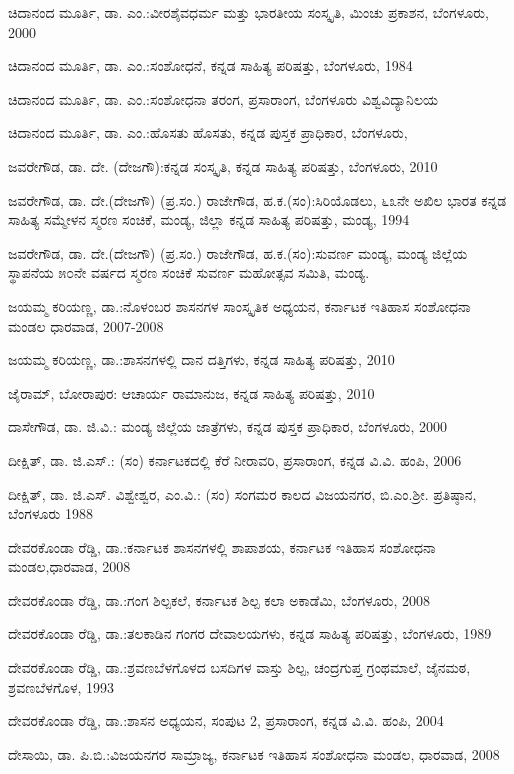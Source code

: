 \noindent
ಚಿದಾನಂದ ಮೂರ್ತಿ, ಡಾ. ಎಂ.:ವೀರಶೈವಧರ್ಮ ಮತ್ತು ಭಾರತೀಯ ಸಂಸ್ಕೃತಿ, ಮಿಂಚು ಪ್ರಕಾಶನ, ಬೆಂಗಳೂರು, 2000

\noindent
ಚಿದಾನಂದ ಮೂರ್ತಿ, ಡಾ. ಎಂ.:ಸಂಶೋಧನೆ, ಕನ್ನಡ ಸಾಹಿತ್ಯ ಪರಿಷತ್ತು, ಬೆಂಗಳೂರು, 1984

\noindent
ಚಿದಾನಂದ ಮೂರ್ತಿ, ಡಾ. ಎಂ.:ಸಂಶೋಧನಾ ತರಂಗ, ಪ್ರಸಾರಾಂಗ, ಬೆಂಗಳೂರು ವಿಶ್ವವಿದ್ಯಾನಿಲಯ

\noindent
ಚಿದಾನಂದ ಮೂರ್ತಿ, ಡಾ. ಎಂ.:ಹೊಸತು ಹೊಸತು, ಕನ್ನಡ ಪುಸ್ತಕ ಪ್ರಾಧಿಕಾರ, ಬೆಂಗಳೂರು,

\noindent
ಜವರೇಗೌಡ, ಡಾ. ದೇ. (ದೇಜಗೌ):ಕನ್ನಡ ಸಂಸ್ಕೃತಿ, ಕನ್ನಡ ಸಾಹಿತ್ಯ ಪರಿಷತ್ತು, ಬೆಂಗಳೂರು, 2010

\noindent
ಜವರೇಗೌಡ, ಡಾ. ದೇ.(ದೇಜಗೌ) (ಪ್ರ.ಸಂ.) ರಾಜೇಗೌಡ, ಹ.ಕ.(ಸಂ):ಸಿರಿಯೊಡಲು, ೬೩ನೇ ಅಖಿಲ ಭಾರತ ಕನ್ನಡ ಸಾಹಿತ್ಯ ಸಮ್ಮೇಳನ ಸ್ಮರಣ ಸಂಚಿಕೆ, ಮಂಡ್ಯ, ಜಿಲ್ಲಾ ಕನ್ನಡ ಸಾಹಿತ್ಯ ಪರಿಷತ್ತು, ಮಂಡ್ಯ, 1994

\noindent
ಜವರೇಗೌಡ, ಡಾ. ದೇ.(ದೇಜಗೌ) (ಪ್ರ.ಸಂ.) ರಾಜೇಗೌಡ, ಹ.ಕ.(ಸಂ):ಸುವರ್ಣ ಮಂಡ್ಯ, ಮಂಡ್ಯ ಜಿಲ್ಲೆಯ ಸ್ಥಾಪನೆಯ ೫೦ನೇ ವರ್ಷದ ಸ್ಮರಣ ಸಂಚಿಕೆ ಸುವರ್ಣ ಮಹೋತ್ಸವ ಸಮಿತಿ, ಮಂಡ್ಯ.

\noindent
ಜಯಮ್ಮ ಕರಿಯಣ್ಣ, ಡಾ.:ನೊಳಂಬರ ಶಾಸನಗಳ ಸಾಂಸ್ಕೃತಿಕ ಅಧ್ಯಯನ, ಕರ್ನಾಟಕ ಇತಿಹಾಸ ಸಂಶೋಧನಾ ಮಂಡಲ ಧಾರವಾಡ, 2007-2008

\noindent
ಜಯಮ್ಮ ಕರಿಯಣ್ಣ, ಡಾ.:ಶಾಸನಗಳಲ್ಲಿ ದಾನ ದತ್ತಿಗಳು, ಕನ್ನಡ ಸಾಹಿತ್ಯ ಪರಿಷತ್ತು, 2010

\noindent
ಜೈರಾಮ್, ಬೋರಾಪುರ: ಆಚಾರ್ಯ ರಾಮಾನುಜ, ಕನ್ನಡ ಸಾಹಿತ್ಯ ಪರಿಷತ್ತು, 2010

\noindent
ದಾಸೇಗೌಡ, ಡಾ. ಜಿ.ವಿ.: ಮಂಡ್ಯ ಜಿಲ್ಲೆಯ ಜಾತ್ರೆಗಳು, ಕನ್ನಡ ಪುಸ್ತಕ ಪ್ರಾಧಿಕಾರ, ಬೆಂಗಳೂರು, 2000

\noindent
ದೀಕ್ಷಿತ್​, ಡಾ. ಜಿ.ಎಸ್​.: (ಸಂ) ಕರ್ನಾಟಕದಲ್ಲಿ ಕೆರೆ ನೀರಾವರಿ, ಪ್ರಸಾರಾಂಗ, ಕನ್ನಡ ವಿ.ವಿ. ಹಂಪಿ, 2006

\noindent
ದೀಕ್ಷಿತ್​, ಡಾ. ಜಿ.ಎಸ್​. ವಿಶ್ವೇಶ್ವರ, ಎಂ.ವಿ.: (ಸಂ) ಸಂಗಮರ ಕಾಲದ ವಿಜಯನಗರ, ಬಿ.ಎಂ.ಶ‍್ರೀ. ಪ್ರತಿಷ್ಠಾನ, ಬೆಂಗಳೂರು 1988

\noindent
ದೇವರಕೊಂಡಾ ರೆಡ್ಡಿ, ಡಾ.:ಕರ್ನಾಟಕ ಶಾಸನಗಳಲ್ಲಿ ಶಾಪಾಶಯ, ಕರ್ನಾಟಕ ಇತಿಹಾಸ ಸಂಶೋಧನಾ ಮಂಡಲ,ಧಾರವಾಡ, 2008

\noindent
ದೇವರಕೊಂಡಾ ರೆಡ್ಡಿ, ಡಾ.:ಗಂಗ ಶಿಲ್ಪಕಲೆ, ಕರ್ನಾಟಕ ಶಿಲ್ಪ ಕಲಾ ಅಕಾಡೆಮಿ, ಬೆಂಗಳೂರು, 2008

\noindent
ದೇವರಕೊಂಡಾ ರೆಡ್ಡಿ, ಡಾ.:ತಲಕಾಡಿನ ಗಂಗರ ದೇವಾಲಯಗಳು, ಕನ್ನಡ ಸಾಹಿತ್ಯ ಪರಿಷತ್ತು, ಬೆಂಗಳೂರು, 1989

\noindent
ದೇವರಕೊಂಡಾ ರೆಡ್ಡಿ, ಡಾ.:ಶ್ರವಣಬೆಳಗೊಳದ ಬಸದಿಗಳ ವಾಸ್ತು ಶಿಲ್ಪ, ಚಂದ್ರಗುಪ್ತ ಗ್ರಂಥಮಾಲೆ, ಜೈನಮಠ, ಶ್ರವಣಬೆಳಗೊಳ, 1993

\noindent
ದೇವರಕೊಂಡಾ ರೆಡ್ಡಿ, ಡಾ.:ಶಾಸನ ಅಧ್ಯಯನ, ಸಂಪುಟ 2, ಪ್ರಸಾರಾಂಗ, ಕನ್ನಡ ವಿ.ವಿ. ಹಂಪಿ, 2004

\noindent
ದೇಸಾಯಿ, ಡಾ. ಪಿ.ಬಿ.:ವಿಜಯನಗರ ಸಾಮ್ರಾಜ್ಯ, ಕರ್ನಾಟಕ ಇತಿಹಾಸ ಸಂಶೋಧನಾ ಮಂಡಲ, ಧಾರವಾಡ, 2008

